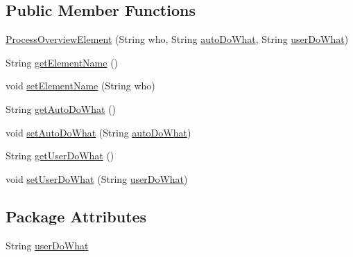 \subsection*{Public Member Functions}
\begin{DoxyCompactItemize}
\item 
\hyperlink{classit_1_1isislab_1_1masonhelperdocumentation_1_1_o_d_d_1_1_process_overview_element_a354ae8ad63ee5c60e2194c00027acee2}{Process\-Overview\-Element} (String who, String \hyperlink{classit_1_1isislab_1_1masonhelperdocumentation_1_1_o_d_d_1_1_process_overview_element_a089fb4d866c8dd54cc8deca8f51127e2}{auto\-Do\-What}, String \hyperlink{classit_1_1isislab_1_1masonhelperdocumentation_1_1_o_d_d_1_1_process_overview_element_adf547a3ee1fe686d4e7cb2a446761a52}{user\-Do\-What})
\item 
String \hyperlink{classit_1_1isislab_1_1masonhelperdocumentation_1_1_o_d_d_1_1_process_overview_element_a139036853655f6b0a140a48bd91107d2}{get\-Element\-Name} ()
\item 
void \hyperlink{classit_1_1isislab_1_1masonhelperdocumentation_1_1_o_d_d_1_1_process_overview_element_a93bcf49c4b4fa3acc2f4a1f7530b9cb9}{set\-Element\-Name} (String who)
\item 
String \hyperlink{classit_1_1isislab_1_1masonhelperdocumentation_1_1_o_d_d_1_1_process_overview_element_a104c9a9f9c5a37db647d4b28cc464c00}{get\-Auto\-Do\-What} ()
\item 
void \hyperlink{classit_1_1isislab_1_1masonhelperdocumentation_1_1_o_d_d_1_1_process_overview_element_abdd4c24c71b022004d28adde5dacecad}{set\-Auto\-Do\-What} (String \hyperlink{classit_1_1isislab_1_1masonhelperdocumentation_1_1_o_d_d_1_1_process_overview_element_a089fb4d866c8dd54cc8deca8f51127e2}{auto\-Do\-What})
\item 
String \hyperlink{classit_1_1isislab_1_1masonhelperdocumentation_1_1_o_d_d_1_1_process_overview_element_abca1f48af630415bf0b6e8efd4b2189d}{get\-User\-Do\-What} ()
\item 
void \hyperlink{classit_1_1isislab_1_1masonhelperdocumentation_1_1_o_d_d_1_1_process_overview_element_aad4fc02b3b9d900bb7d528c319e8861e}{set\-User\-Do\-What} (String \hyperlink{classit_1_1isislab_1_1masonhelperdocumentation_1_1_o_d_d_1_1_process_overview_element_adf547a3ee1fe686d4e7cb2a446761a52}{user\-Do\-What})
\end{DoxyCompactItemize}
\subsection*{Package Attributes}
\begin{DoxyCompactItemize}
\item 
String \hyperlink{classit_1_1isislab_1_1masonhelperdocumentation_1_1_o_d_d_1_1_process_overview_element_adf547a3ee1fe686d4e7cb2a446761a52}{user\-Do\-What}
\end{DoxyCompactItemize}

